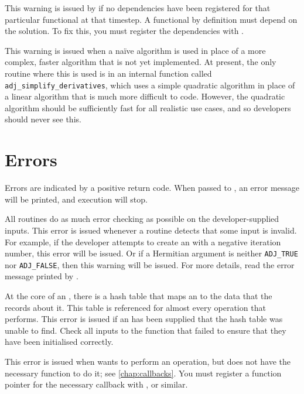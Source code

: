 This warning is issued by  if no dependencies have been
registered for that particular functional at that timestep. A functional by definition must depend on the solution. To fix this, you must register the dependencies with
.

This warning is issued when a na\"ive algorithm is used in place of a more complex,
faster algorithm that is not yet implemented. At present, the only routine where
this is used is in an internal function called \texttt{adj_simplify_derivatives}, which uses a simple quadratic
algorithm in place of a linear algorithm that is much more difficult to code.
However, the quadratic algorithm should be sufficiently fast for all realistic
use cases, and so developers should never see this.

\section{Errors}
Errors are indicated by a positive return code. When passed to ,
an error message will be printed, and execution will stop.

All \libadjoint routines do as much error checking as possible
on the developer-supplied inputs. This error is issued whenever a \libadjoint routine
detects that some input is invalid. For example, if the developer attempts to create
an  with a negative iteration number, this error will be issued. Or
if a Hermitian argument is neither \texttt{ADJ_TRUE} nor \texttt{ADJ_FALSE}, then this warning
will be issued. For more details, read the error message printed by .

At the core of an , there is a hash table that maps an
 to the data that the  records about it.
This table is referenced for almost every operation that \libadjoint performs. This error
is issued if an  has been supplied that the hash table was
unable to find. Check all  inputs to the function that failed to ensure that they have been
initialised correctly.

This error is issued when \libadjoint wants to perform an operation, but does
not have the necessary function to do it; see \autoref{chap:callbacks}. You
must register a function pointer for the necessary callback with ,
 or similar.

